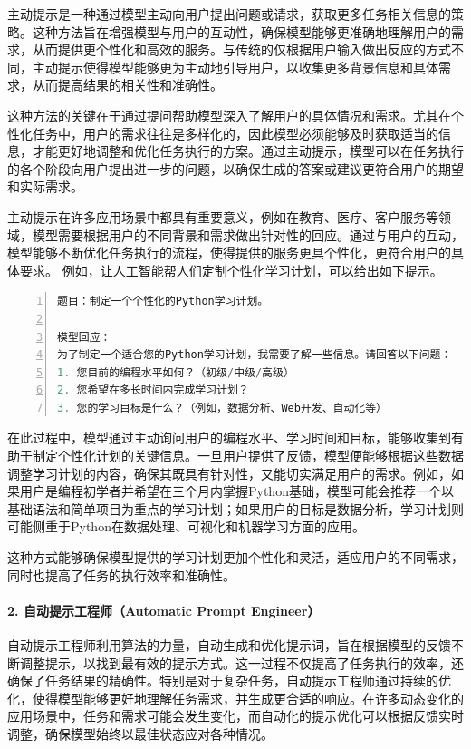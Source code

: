 主动提示是一种通过模型主动向用户提出问题或请求，获取更多任务相关信息的策略。这种方法旨在增强模型与用户的互动性，确保模型能够更准确地理解用户的需求，从而提供更个性化和高效的服务。与传统的仅根据用户输入做出反应的方式不同，主动提示使得模型能够更为主动地引导用户，以收集更多背景信息和具体需求，从而提高结果的相关性和准确性。

这种方法的关键在于通过提问帮助模型深入了解用户的具体情况和需求。尤其在个性化任务中，用户的需求往往是多样化的，因此模型必须能够及时获取适当的信息，才能更好地调整和优化任务执行的方案。通过主动提示，模型可以在任务执行的各个阶段向用户提出进一步的问题，以确保生成的答案或建议更符合用户的期望和实际需求。

主动提示在许多应用场景中都具有重要意义，例如在教育、医疗、客户服务等领域，模型需要根据用户的不同背景和需求做出针对性的回应。通过与用户的互动，模型能够不断优化任务执行的流程，使得提供的服务更具个性化，更符合用户的具体要求。
例如，让人工智能帮人们定制个性化学习计划，可以给出如下提示。

\begin{lstlisting}[language={python},label={},caption={}, basicstyle=\footnotesize\ttfamily, breaklines=true, numbers=left, frame=single]
题目：制定一个个性化的Python学习计划。

模型回应：
为了制定一个适合您的Python学习计划，我需要了解一些信息。请回答以下问题：
1. 您目前的编程水平如何？（初级/中级/高级）
2. 您希望在多长时间内完成学习计划？
3. 您的学习目标是什么？（例如，数据分析、Web开发、自动化等）
\end{lstlisting}

在此过程中，模型通过主动询问用户的编程水平、学习时间和目标，能够收集到有助于制定个性化计划的关键信息。一旦用户提供了反馈，模型便能够根据这些数据调整学习计划的内容，确保其既具有针对性，又能切实满足用户的需求。例如，如果用户是编程初学者并希望在三个月内掌握Python基础，模型可能会推荐一个以基础语法和简单项目为重点的学习计划；如果用户的目标是数据分析，学习计划则可能侧重于Python在数据处理、可视化和机器学习方面的应用。

这种方式能够确保模型提供的学习计划更加个性化和灵活，适应用户的不同需求，同时也提高了任务的执行效率和准确性。

\paragraph{2. 自动提示工程师（Automatic Prompt Engineer）} 

自动提示工程师利用算法的力量，自动生成和优化提示词，旨在根据模型的反馈不断调整提示，以找到最有效的提示方式。这一过程不仅提高了任务执行的效率，还确保了任务结果的精确性。特别是对于复杂任务，自动提示工程师通过持续的优化，使得模型能够更好地理解任务需求，并生成更合适的响应。在许多动态变化的应用场景中，任务和需求可能会发生变化，而自动化的提示优化可以根据反馈实时调整，确保模型始终以最佳状态应对各种情况。

